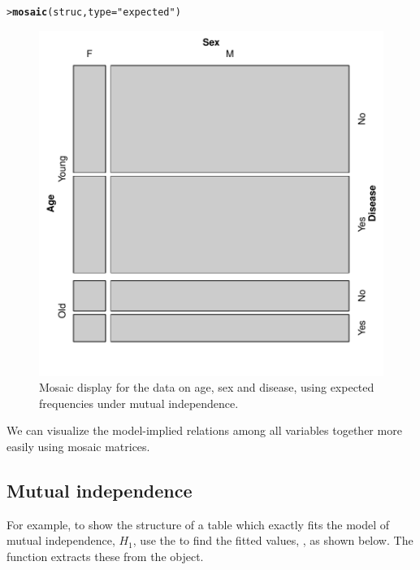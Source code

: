 \documentclass[10pt,krantz2]{krantz}\usepackage[]{graphicx}\usepackage[]{color}
\makeatletter
\newcommand{\hlstr}[1]{\textcolor[rgb]{0.192,0.494,0.8}{#1}}%
\newcommand{\hlstd}[1]{\textcolor[rgb]{0.345,0.345,0.345}{#1}}%
\newcommand{\hlkwc}[1]{\textcolor[rgb]{0.333,0.667,0.333}{#1}}%
\newcommand{\hlkwd}[1]{\textcolor[rgb]{0.737,0.353,0.396}{\textbf{#1}}}%
\newenvironment{kframe}{%
 \def\at@end@of@kframe{}%
 \ifinner\ifhmode%
  \def\at@end@of@kframe{\end{minipage}}%
  \begin{minipage}{\columnwidth}%
 \fi\fi%
 \def\FrameCommand##1{\hskip\@totalleftmargin \hskip-\fboxsep
 \colorbox{shadecolor}{##1}\hskip-\fboxsep
     \hskip-\linewidth \hskip-\@totalleftmargin \hskip\columnwidth}%
 \MakeFramed {\advance\hsize-\width
   \@totalleftmargin\z@ \linewidth\hsize
   \@setminipage}}%
 {\par\unskip\endMakeFramed%
 \at@end@of@kframe}
\newenvironment{knitrout}{}{} %
\renewenvironment{knitrout}{\small\renewcommand{\baselinestretch}{.85}}{} %
\makeatother
\begin{document}
\begin{knitrout}
\color{fgcolor}\begin{kframe}
\begin{alltt}
\hlstd{> }\hlkwd{mosaic}\hlstd{(struc,} \hlkwc{type} \hlstd{=} \hlstr{"expected"}\hlstd{)}
\end{alltt}
\end{kframe}\begin{figure}[!htbp]

\centerline{\includegraphics[width=.5\textwidth]{ch05/fig/struc-mos2-1} }

\caption[Mosaic display for the data on age, sex and disease, using expected frequencies under mutual independence]{Mosaic display for the data on age, sex and disease, using expected frequencies under mutual independence.}\label{fig:struc-mos2}
\end{figure}


\end{knitrout}
We can visualize the model-implied relations among all variables together more easily
using mosaic matrices.

\subsection{Mutual independence}
For example, to show the structure of a table which exactly fits the model of
mutual independence, $H_1$, use the  to find the
fitted values, , as shown below.  The
function  extracts these from the  object.
\end{document}
